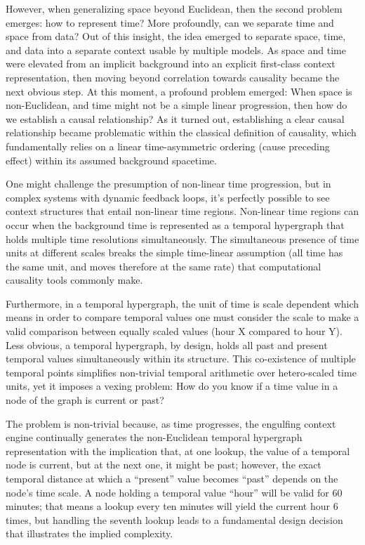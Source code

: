 However, when generalizing space beyond Euclidean, then the second problem emerges: how to represent time? More profoundly, can we separate time and space from data? Out of this insight, the idea emerged to separate space, time, and data into a separate context usable by multiple models. As space and time were elevated from an implicit background into an explicit first-class context representation, then moving beyond correlation towards causality became the next obvious step. At this moment, a profound problem emerged: When space is non-Euclidean, and time might not be a simple linear progression, then how do we establish a causal relationship?
As it turned out, establishing a clear causal relationship became problematic within the classical definition of causality, which fundamentally relies on a linear time-asymmetric ordering (cause preceding effect) within its assumed background spacetime.

One might challenge the presumption of non-linear time progression, but in complex systems with dynamic feedback loops, it’s perfectly possible to see context structures that entail non-linear time regions. Non-linear time regions can occur when the background time is represented as a temporal hypergraph that holds multiple time resolutions simultaneously. The simultaneous presence of time units at different scales breaks the simple time-linear assumption (all time has the same unit, and moves therefore at the same rate) that computational causality tools commonly make.

Furthermore, in a temporal hypergraph, the unit of time is scale dependent which means in order to compare temporal values one must consider the scale to make a valid comparison between equally scaled values (hour X compared to hour Y). Less obvious, a temporal hypergraph, by design, holds all past and present temporal values simultaneously within its structure. This co-existence of multiple temporal points simplifies non-trivial temporal arithmetic over hetero-scaled time units, yet it imposes a vexing problem: How do you know if a time value in a node of the graph is current or past?

The problem is non-trivial because, as time progresses, the engulfing context engine continually generates the non-Euclidean temporal hypergraph representation with the implication that, at one lookup, the value of a temporal node is current, but at the next one, it might be past; however, the exact temporal distance at which a “present” value becomes “past” depends on the node's time scale. A node holding a temporal value “hour” will be valid for 60 minutes; that means a lookup every ten minutes will yield the current hour 6 times, but handling the seventh lookup leads to a fundamental design decision that illustrates the implied complexity.

